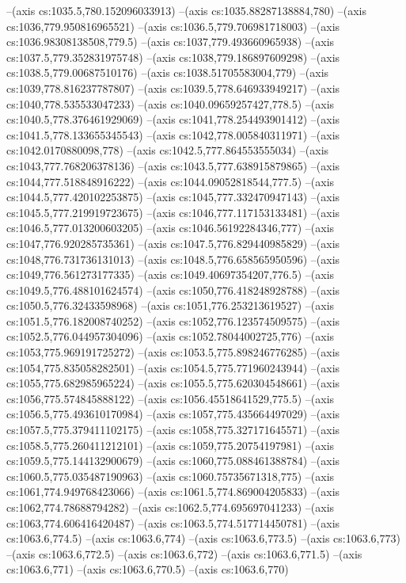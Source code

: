 --(axis cs:1035.5,780.152096033913)
--(axis cs:1035.88287138884,780)
--(axis cs:1036,779.950816965521)
--(axis cs:1036.5,779.706981718003)
--(axis cs:1036.98308138508,779.5)
--(axis cs:1037,779.493660965938)
--(axis cs:1037.5,779.352831975748)
--(axis cs:1038,779.186897609298)
--(axis cs:1038.5,779.00687510176)
--(axis cs:1038.51705583004,779)
--(axis cs:1039,778.816237787807)
--(axis cs:1039.5,778.646933949217)
--(axis cs:1040,778.535533047233)
--(axis cs:1040.09659257427,778.5)
--(axis cs:1040.5,778.376461929069)
--(axis cs:1041,778.254493901412)
--(axis cs:1041.5,778.133655345543)
--(axis cs:1042,778.005840311971)
--(axis cs:1042.0170880098,778)
--(axis cs:1042.5,777.864553555034)
--(axis cs:1043,777.768206378136)
--(axis cs:1043.5,777.638915879865)
--(axis cs:1044,777.518848916222)
--(axis cs:1044.09052818544,777.5)
--(axis cs:1044.5,777.420102253875)
--(axis cs:1045,777.332470947143)
--(axis cs:1045.5,777.219919723675)
--(axis cs:1046,777.117153133481)
--(axis cs:1046.5,777.013200603205)
--(axis cs:1046.56192284346,777)
--(axis cs:1047,776.920285735361)
--(axis cs:1047.5,776.829440985829)
--(axis cs:1048,776.731736131013)
--(axis cs:1048.5,776.658565950596)
--(axis cs:1049,776.561273177335)
--(axis cs:1049.40697354207,776.5)
--(axis cs:1049.5,776.488101624574)
--(axis cs:1050,776.418248928788)
--(axis cs:1050.5,776.32433598968)
--(axis cs:1051,776.253213619527)
--(axis cs:1051.5,776.182008740252)
--(axis cs:1052,776.123574509575)
--(axis cs:1052.5,776.044957304096)
--(axis cs:1052.78044002725,776)
--(axis cs:1053,775.969191725272)
--(axis cs:1053.5,775.898246776285)
--(axis cs:1054,775.835058282501)
--(axis cs:1054.5,775.771960243944)
--(axis cs:1055,775.682985965224)
--(axis cs:1055.5,775.620304548661)
--(axis cs:1056,775.574845888122)
--(axis cs:1056.45518641529,775.5)
--(axis cs:1056.5,775.493610170984)
--(axis cs:1057,775.435664497029)
--(axis cs:1057.5,775.379411102175)
--(axis cs:1058,775.327171645571)
--(axis cs:1058.5,775.260411212101)
--(axis cs:1059,775.20754197981)
--(axis cs:1059.5,775.144132900679)
--(axis cs:1060,775.088461388784)
--(axis cs:1060.5,775.035487190963)
--(axis cs:1060.75735671318,775)
--(axis cs:1061,774.949768423066)
--(axis cs:1061.5,774.869004205833)
--(axis cs:1062,774.78688794282)
--(axis cs:1062.5,774.695697041233)
--(axis cs:1063,774.606416420487)
--(axis cs:1063.5,774.517714450781)
--(axis cs:1063.6,774.5)
--(axis cs:1063.6,774)
--(axis cs:1063.6,773.5)
--(axis cs:1063.6,773)
--(axis cs:1063.6,772.5)
--(axis cs:1063.6,772)
--(axis cs:1063.6,771.5)
--(axis cs:1063.6,771)
--(axis cs:1063.6,770.5)
--(axis cs:1063.6,770)
